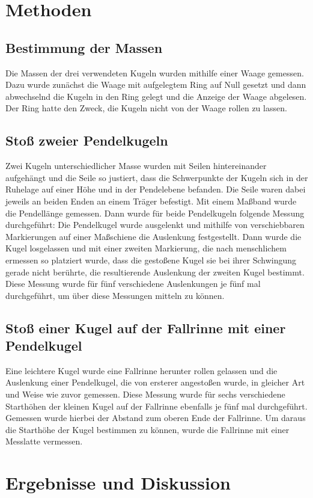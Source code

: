 \documentclass[
	a4paper,
	12pt,
	pagesize,
	ngerman
]{scrartcl}
\begin{document}
	\section{Methoden}
	\subsection{Bestimmung der Massen}
	Die Massen der drei verwendeten Kugeln wurden mithilfe einer Waage gemessen.
	Dazu wurde zunächst die Waage mit aufgelegtem Ring auf Null gesetzt und dann abwechselnd die Kugeln in den Ring gelegt und die Anzeige der Waage abgelesen.
	Der Ring hatte den Zweck, die Kugeln nicht von der Waage rollen zu lassen.
	
	\subsection{Stoß zweier Pendelkugeln} 
	Zwei Kugeln unterschiedlicher Masse wurden mit Seilen hintereinander aufgehängt und die Seile so justiert, dass die Schwerpunkte der Kugeln sich in der Ruhelage auf einer Höhe und in der Pendelebene befanden.
	Die Seile waren dabei jeweils an beiden Enden an einem Träger befestigt.
	Mit einem Maßband wurde die Pendellänge gemessen.
	Dann wurde für beide Pendelkugeln folgende Messung durchgeführt:
	Die Pendelkugel wurde ausgelenkt und mithilfe von verschiebbaren Markierungen auf einer Maßschiene die Auslenkung festgestellt.
	Dann wurde die Kugel losgelassen und mit einer zweiten Markierung, die nach menschlichem ermessen so platziert wurde, dass die gestoßene Kugel sie bei ihrer Schwingung gerade nicht berührte, die resultierende Auslenkung der zweiten Kugel bestimmt.
	Diese Messung wurde für fünf verschiedene Auslenkungen je fünf mal durchgeführt, um über diese Messungen mitteln zu können.
	\subsection{Stoß einer Kugel auf der Fallrinne mit einer Pendelkugel}
	Eine leichtere Kugel wurde eine Fallrinne herunter rollen gelassen und die Auslenkung einer Pendelkugel, die von ersterer angestoßen wurde, in gleicher Art und Weise wie zuvor gemessen.
	Diese Messung wurde für sechs verschiedene Starthöhen der kleinen Kugel auf der Fallrinne ebenfalls je fünf mal durchgeführt.
	Gemessen wurde hierbei der Abstand zum oberen Ende der Fallrinne.
	Um daraus die Starthöhe der Kugel bestimmen zu können, wurde die Fallrinne mit einer Messlatte vermessen.
	
	
	\section{Ergebnisse und Diskussion}
	
\end{document}
